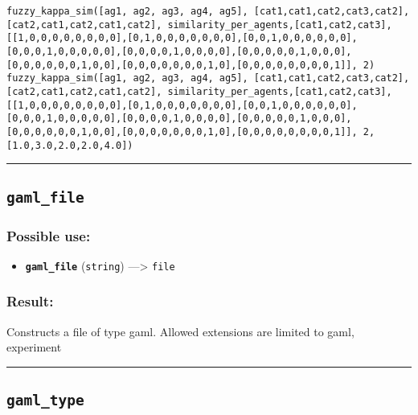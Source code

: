 \documentclass[]{book}
\providecommand{\tightlist}{%
  \setlength{\itemsep}{0pt}\setlength{\parskip}{0pt}}
\theoremstyle{definition}
\theoremstyle{definition}
\theoremstyle{definition}
\theoremstyle{remark}
\begin{document}
\begin{verbatim}
fuzzy_kappa_sim([ag1, ag2, ag3, ag4, ag5], [cat1,cat1,cat2,cat3,cat2],[cat2,cat1,cat2,cat1,cat2], similarity_per_agents,[cat1,cat2,cat3],[[1,0,0,0,0,0,0,0,0],[0,1,0,0,0,0,0,0,0],[0,0,1,0,0,0,0,0,0],[0,0,0,1,0,0,0,0,0],[0,0,0,0,1,0,0,0,0],[0,0,0,0,0,1,0,0,0],[0,0,0,0,0,0,1,0,0],[0,0,0,0,0,0,0,1,0],[0,0,0,0,0,0,0,0,1]], 2) fuzzy_kappa_sim([ag1, ag2, ag3, ag4, ag5], [cat1,cat1,cat2,cat3,cat2],[cat2,cat1,cat2,cat1,cat2], similarity_per_agents,[cat1,cat2,cat3],[[1,0,0,0,0,0,0,0,0],[0,1,0,0,0,0,0,0,0],[0,0,1,0,0,0,0,0,0],[0,0,0,1,0,0,0,0,0],[0,0,0,0,1,0,0,0,0],[0,0,0,0,0,1,0,0,0],[0,0,0,0,0,0,1,0,0],[0,0,0,0,0,0,0,1,0],[0,0,0,0,0,0,0,0,1]], 2,[1.0,3.0,2.0,2.0,4.0]) 
\end{verbatim}

\begin{center}\rule{0.5\linewidth}{\linethickness}\end{center}

\subsection{\texorpdfstring{\texttt{gaml\_file}}{gaml\_file}}\label{gaml_file}

\subsubsection{Possible use:}\label{possible-use-178}

\begin{itemize}
\tightlist
\item
  \textbf{\texttt{gaml\_file}} (\texttt{string}) ---\textgreater{}
  \texttt{file}
\end{itemize}

\subsubsection{Result:}\label{result-172}

Constructs a file of type gaml. Allowed extensions are limited to gaml,
experiment

\begin{center}\rule{0.5\linewidth}{\linethickness}\end{center}

\subsection{\texorpdfstring{\texttt{gaml\_type}}{gaml\_type}}\label{gaml_type}
\end{document}
